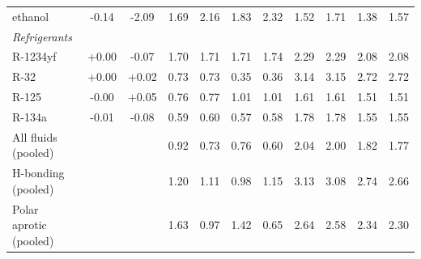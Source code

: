 \begin{table}[H]
\begin{tabular}{lcccccccccc}
ethanol & -0.14 & -2.09 & 1.69 & 2.16 & 1.83 & 2.32 & 1.52 & 1.71 & 1.38 & 1.57 \\
\multicolumn{11}{l}{\emph{Refrigerants}} \\
R-1234yf & +0.00 & -0.07 & 1.70 & 1.71 & 1.71 & 1.74 & 2.29 & 2.29 & 2.08 & 2.08 \\
R-32 & +0.00 & +0.02 & 0.73 & 0.73 & 0.35 & 0.36 & 3.14 & 3.15 & 2.72 & 2.72 \\
R-125 & -0.00 & +0.05 & 0.76 & 0.77 & 1.01 & 1.01 & 1.61 & 1.61 & 1.51 & 1.51 \\
R-134a & -0.01 & -0.08 & 0.59 & 0.60 & 0.57 & 0.58 & 1.78 & 1.78 & 1.55 & 1.55 \\
\midrule
All fluids (pooled) &  &  & 0.92 & 0.73 & 0.76 & 0.60 & 2.04 & 2.00 & 1.82 & 1.77 \\
H-bonding (pooled) &  &  & 1.20 & 1.11 & 0.98 & 1.15 & 3.13 & 3.08 & 2.74 & 2.66 \\
Polar aprotic (pooled) &  &  & 1.63 & 0.97 & 1.42 & 0.65 & 2.64 & 2.58 & 2.34 & 2.30 \\
\bottomrule
\end{tabular}
\end{table}
